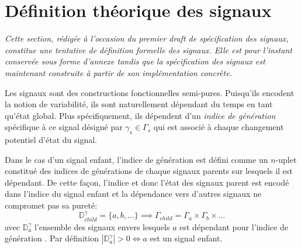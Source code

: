 \chapter{Définition théorique des signaux}
	
\textit{Cette section, rédigée à l'occasion du premier draft de spécification des signaux, constitue une tentative de définition formelle des signaux. Elle est pour l'instant conservée sous forme d'annexe tandis que la spécification des signaux est maintenant construite à partir de son implémentation concrète.}
\vspace{0.5cm}
	
Les signaux sont des constructions fonctionnelles semi-pures. Puisqu'ils encodent la notion de variabilité, ils sont naturellement dépendant du temps en tant qu'état global. Plus spécifiquement, ils dépendent d'un \emph{indice de génération} spécifique à ce signal désigné par $\gamma_s \in \Gamma_s$ qui est associé à chaque changement potentiel d'état du signal.

Dans le cas d'un signal enfant, l'indice de génération est défini comme un $n$-uplet constitué des indices de générations de chaque signaux parents sur lesquels il est dépendant. De cette façon, l'indice et donc l'état des signaux parent est encodé dans l'indice du signal enfant et la dépendance vers d'autres signaux ne compromet pas sa pureté:
\[
	\mathbb{D}^\gamma_{child} = \{ a, b, \dots \} \implies \Gamma_{child} = \Gamma_a \times \Gamma_b \times \dots
\]
avec $\mathbb{D}^\gamma_{a}$ l'ensemble des signaux envers lesquels $a$ est dépendant pour l'indice de génération \gamma. Par définition $|\mathbb{D}^\gamma_{a}| > 0 \iff a$ est un signal enfant.

